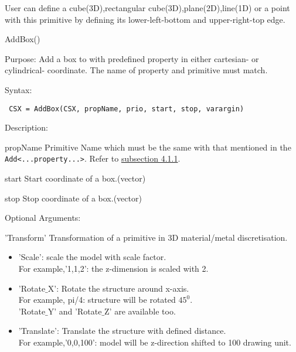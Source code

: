 User can define a cube(3D),rectangular cube(3D),plane(2D),line(1D) or a point with this primitive by defining its lower-left-bottom and upper-right-top edge.

\begin{FontNameFunct}{AddBox()}
\end{FontNameFunct} 

\begin{FontDescr}{Purpose:}
Add a box to \label{CSX} with predefined property in either cartesian- or cylindrical- coordinate. The name of property and primitive must match.  
\end{FontDescr}

\begin{FontDescr}{Syntax:}
\begin{lstlisting} 
 CSX = AddBox(CSX, propName, prio, start, stop, varargin)
\end{lstlisting}
\end{FontDescr}

\begin{FontDescr}{Description:}

\begin{FontPara}{propName}  \label{prim_Name}
Primitive Name which must be the same with that mentioned in the \texttt{Add<...property...>}. Refer to \hyperref[subsection_gprop_setup]{subsection 4.1.1}.
\end{FontPara}

\begin{FontPara}{start}
Start coordinate of a box.(vector)
\end{FontPara}

\begin{FontPara}{stop}
Stop coordinate of a box.(vector)
\end{FontPara}

\end{FontDescr}

\begin{FontDescr}{Optional Arguments:}  \label{prim_transform}
\begin{FontPara}{'Transform'}
Transformation of a primitive in 3D material/metal discretisation.
\begin{itemize}
\item\textcolor{varcol}{'Scale'}: scale the model with scale factor.\\ For example,'1,1,2': the z-dimension is scaled with 2. 

\item\textcolor{varcol}{'Rotate$\_$X'}:  Rotate the structure around x-axis.\\ For example, pi/4: structure will be rotated $45^{0}$. \\'Rotate$\_$Y' and 'Rotate$\_$Z' are available too.  

\item\textcolor{varcol}{'Translate'}: Translate the structure with defined distance.\\For example,'0,0,100': model will be z-direction shifted to 100 drawing unit.
\end{itemize}
\end{FontPara}
\end{FontDescr}

